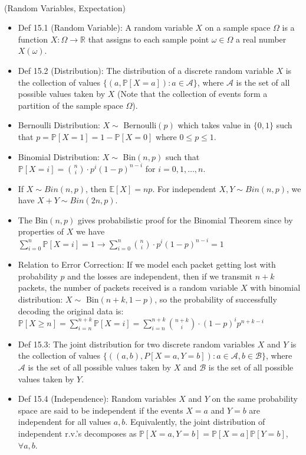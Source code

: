\documentclass{article}
\begin{document}
 \\
(Random Variables, Expectation)
\begin{itemize}
	\item Def 15.1 (Random Variable): A random variable $X$ on a sample space $\Omega$ is a function $X: \Omega\rightarrow\mathbb{R}$ that assigns to each sample point $\omega\in\Omega$ a real number $X(\omega)$.
	\item Def 15.2 (Distribution): The distribution of a discrete random variable $X$ is the collection of values $\{(a,\mathbb{P}[X = a]): a\in\mathscr{A}\}$, where $\mathscr{A}$ is the set of all possible values taken by $X$ (Note that the collection of events form a partition of the sample space $\Omega$).
	\item Bernoulli Distribution: $X\sim$ Bernoulli$(p)$ which takes value in $\{0,1\}$ such that $p = \mathbb{P}[X=1] = 1-\mathbb{P}[X=0]$ where $0\leq p\leq1$.
	\item Binomial Distribution: $X\sim$ Bin$(n,p)$ such that $\mathbb{P}[X=i] = \binom{n}{i}\cdot p^i(1-p)^{n-i}$ for $i=0,1,\dots,n$.
	\item If $X\sim Bin(n,p)$, then $\mathbb{E}[X] = np$. For independent $X,Y\sim Bin(n,p)$, we have $X+Y\sim Bin(2n,p)$.
	\item The Bin$(n,p)$ gives probabilistic proof for the Binomial Theorem since by properties of $X$ we have $\sum\limits_{i=0}^n \mathbb{P}[X=i] = 1 \longrightarrow \sum\limits_{i=0}^n \binom{n}{i}\cdot p^i(1-p)^{n-i} = 1$
	\item Relation to Error Correction: If we model each packet getting lost with probability $p$ and the losses are independent, then if we transmit $n+k$ packets, the number of packets received is a random variable $X$ with binomial distribution: $X\sim$ Bin$(n+k, 1-p)$, so the probability of successfully decoding the original data is: $\mathbb{P}[X\geq n] = \sum\limits_{i=n}^{n+k}\mathbb{P}[X=i] = \sum\limits_{i=n}^{n+k} \binom{n+k}{i}\cdot (1-p)^i p^{n+k-i}$
	\item Def 15.3: The joint distribution for two discrete random variables $X$ and $Y$ is the collection of values $\{((a,b),P[X=a,Y=b]):a\in\mathscr{A},b\in\mathscr{B}\}$, where $\mathscr{A}$ is the set of all possible values taken by $X$ and $\mathscr{B}$ is the set of all possible values taken by $Y$.
	\item Def 15.4 (Independence): Random variables $X$ and $Y$ on the same probability space are said to be independent if the events $X = a$ and $Y = b$ are independent for all values $a, b$. Equivalently, the joint distribution of independent r.v.’s decomposes as $\mathbb{P}[X=a,Y=b] = \mathbb{P}[X=a]\mathbb{P}[Y=b]$, $\forall a,b$.

\end{itemize}
\end{document}
